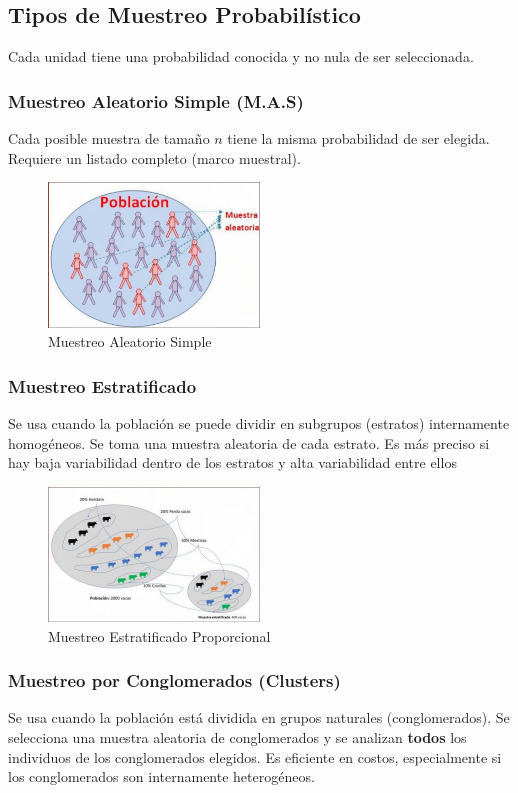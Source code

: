 \documentclass[12pt, letterpaper]{article}
\begin{document}
\subsection{Tipos de Muestreo Probabilístico}
Cada unidad tiene una probabilidad conocida y no nula de ser seleccionada.

\subsubsection{Muestreo Aleatorio Simple (M.A.S)}
Cada posible muestra de tamaño $n$ tiene la misma probabilidad de ser elegida. Requiere un listado completo (marco muestral).
\begin{figure}[htbp]
	\centering
	\includegraphics[width=0.5\textwidth]{MAS}
	\caption{Muestreo Aleatorio Simple}
	\label{fig:MAS}
\end{figure}


\subsubsection{Muestreo Estratificado}
Se usa cuando la población se puede dividir en subgrupos (estratos) internamente homogéneos. Se toma una muestra aleatoria de cada estrato. Es más preciso si hay baja variabilidad dentro de los estratos y alta variabilidad entre ellos

\begin{figure}[htbp]
	\centering
	\includegraphics[width=0.5\textwidth]{MEP}
	\caption{Muestreo Estratificado Proporcional}
	\label{fig:MEP}
\end{figure}


\subsubsection{Muestreo por Conglomerados (Clusters)}
Se usa cuando la población está dividida en grupos naturales (conglomerados). Se selecciona una muestra aleatoria de conglomerados y se analizan \textbf{todos} los individuos de los conglomerados elegidos. Es eficiente en costos, especialmente si los conglomerados son internamente heterogéneos.
\end{document}
